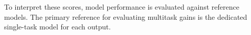 To interpret these scores, model performance is evaluated against reference models.
The primary reference for evaluating multitask gains is the dedicated single-task model
for each output.



